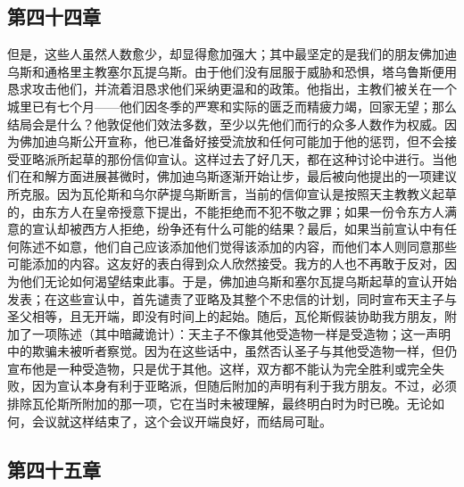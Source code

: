 
\subsection{第四十四章}

但是，这些人虽然人数愈少，却显得愈加强大；其中最坚定的是我们的朋友佛加迪乌斯和通格里主教塞尔瓦提乌斯。由于他们没有屈服于威胁和恐惧，塔乌鲁斯便用恳求攻击他们，并流着泪恳求他们采纳更温和的政策。他指出，主教们被关在一个城里已有七个月——他们因冬季的严寒和实际的匮乏而精疲力竭，回家无望；那么结局会是什么？他敦促他们效法多数，至少以先他们而行的众多人数作为权威。因为佛加迪乌斯公开宣称，他已准备好接受流放和任何可能加于他的惩罚，但不会接受亚略派所起草的那份信仰宣认。这样过去了好几天，都在这种讨论中进行。当他们在和解方面进展甚微时，佛加迪乌斯逐渐开始让步，最后被向他提出的一项建议所克服。因为瓦伦斯和乌尔萨提乌斯断言，当前的信仰宣认是按照天主教教义起草的，由东方人在皇帝授意下提出，不能拒绝而不犯不敬之罪；如果一份令东方人满意的宣认却被西方人拒绝，纷争还有什么可能的结果？最后，如果当前宣认中有任何陈述不如意，他们自己应该添加他们觉得该添加的内容，而他们本人则同意那些可能添加的内容。这友好的表白得到众人欣然接受。我方的人也不再敢于反对，因为他们无论如何渴望结束此事。于是，佛加迪乌斯和塞尔瓦提乌斯起草的宣认开始发表；在这些宣认中，首先谴责了亚略及其整个不忠信的计划，同时宣布天主子与圣父相等，且无开端，即没有时间上的起始。随后，瓦伦斯假装协助我方朋友，附加了一项陈述（其中暗藏诡计）：天主子不像其他受造物一样是受造物；这一声明中的欺骗未被听者察觉。因为在这些话中，虽然否认圣子与其他受造物一样，但仍宣布他是一种受造物，只是优于其他。这样，双方都不能认为完全胜利或完全失败，因为宣认本身有利于亚略派，但随后附加的声明有利于我方朋友。不过，必须排除瓦伦斯所附加的那一项，它在当时未被理解，最终明白时为时已晚。无论如何，会议就这样结束了，这个会议开端良好，而结局可耻。\par


\subsection{第四十五章}

